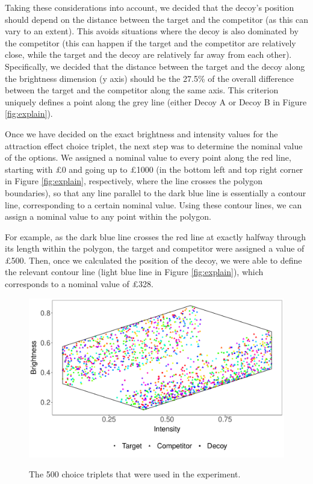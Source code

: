 \documentclass[11pt,a4paper]{article}
\begin{document}
Taking these considerations into account, we decided that the decoy's position should depend on the distance between the target and the competitor (as this can vary to an extent). This avoids situations where the decoy is also dominated by the competitor (this can happen if the target and the competitor are relatively close, while the target and the decoy are relatively far away from each other). Specifically, we decided that the distance between the target and the decoy along the brightness dimension (y axis) should be the 27.5\% of the overall difference between the target and the competitor along the same axis. This criterion uniquely defines a point along the grey line (either Decoy A or Decoy B in Figure \ref{fig:explain}).

Once we have decided on the exact brightness and intensity values for the attraction effect choice triplet, the next step was to determine the nominal value of the options. We assigned a nominal value to every point along the red line, starting with £0 and going up to £1000 (in the bottom left and top right corner in Figure \ref{fig:explain}, respectively, where the line crosses the polygon boundaries), so that any line parallel to the dark blue line is essentially a contour line, corresponding to a certain nominal value. Using these contour lines, we can assign a nominal value to any point within the polygon.

For example, as the dark blue line crosses the red line at exactly halfway through its length within the polygon, the target and competitor were assigned a value of £500. Then, once we calculated the position of the decoy, we were able to define the relevant contour line (light blue line in Figure \ref{fig:explain}), which corresponds to a nominal value of £328. 

\begin{figure}[!htb]
\centering
\caption{The 500 choice triplets that were used in the experiment.}
\includegraphics[width=1\textwidth]{./AE_teapots_Figure_2poly.pdf}
\label{fig:choice_sets}
\end{figure}
\end{document}
